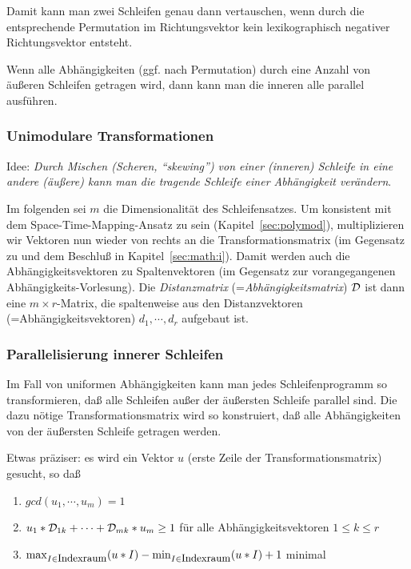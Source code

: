 Damit kann man zwei Schleifen genau dann vertauschen, wenn durch die
entsprechende Permutation im Richtungsvektor kein lexikographisch
negativer Richtungsvektor entsteht. 

Wenn alle Abhängigkeiten (ggf. nach Permutation) durch eine Anzahl von
äußeren Schleifen getragen wird, dann kann man die inneren alle parallel
ausführen.

\subsubsection{Unimodulare Transformationen}

Idee: \textit{Durch Mischen (Scheren, ``skewing'') von einer (inneren)
Schleife in
eine andere (äußere) kann man die tragende Schleife einer Abhängigkeit
verändern}.

Im folgenden sei $m$ die Dimensionalität des Schleifensatzes. Um
konsistent mit dem Space-Time-Mapping-Ansatz zu sein
(Kapitel~\ref{sec:polymod}), multiplizieren wir Vektoren nun wieder von
rechts an die Transformationsmatrix (im Gegensatz zu \cite{Ban93, Ban94}
und dem Beschluß in Kapitel~\ref{sec:math:i}). Damit werden auch die
Abhängigkeitsvektoren zu Spaltenvektoren (im Gegensatz zur
vorangegangenen Abhängigkeits-Vorlesung).  Die \emph{Distanzmatrix}
(=\emph{Abhängigkeitsmatrix}) $\cal D$ ist dann eine
$m\!\times\!r$-Matrix, die spaltenweise aus den Distanzvektoren
(=Abhängigkeitsvektoren) $d_1,\cdots,d_r$ aufgebaut ist.

\subsubsection{Parallelisierung innerer Schleifen}

Im Fall von uniformen Abhängigkeiten kann man jedes Schleifenprogramm so
transformieren, daß alle Schleifen außer der äußersten Schleife parallel
sind. Die dazu nötige Transformationsmatrix wird so konstruiert, daß
alle Abhängigkeiten von der äußersten Schleife getragen werden.

Etwas präziser: es wird ein Vektor $u$ (erste Zeile der
Transformationsmatrix) gesucht, so daß
\begin{enumerate}
\item $gcd(u_1,\cdots,u_m) = 1$\\[-7mm]
\item $u_1*{\cal D}_{1k} + \cdots + {\cal D}_{mk}*u_m \geq 1$ für alle
  Abhängigkeitsvektoren $1\!\leq\!k\!\leq\!r$\\[-7mm]
\item $\max_{I\in \textrm{\small Indexraum}}(u*I) - \min_{I\in
    \textrm{\small Indexraum}}(u*I) + 1$ minimal
\end{enumerate}


